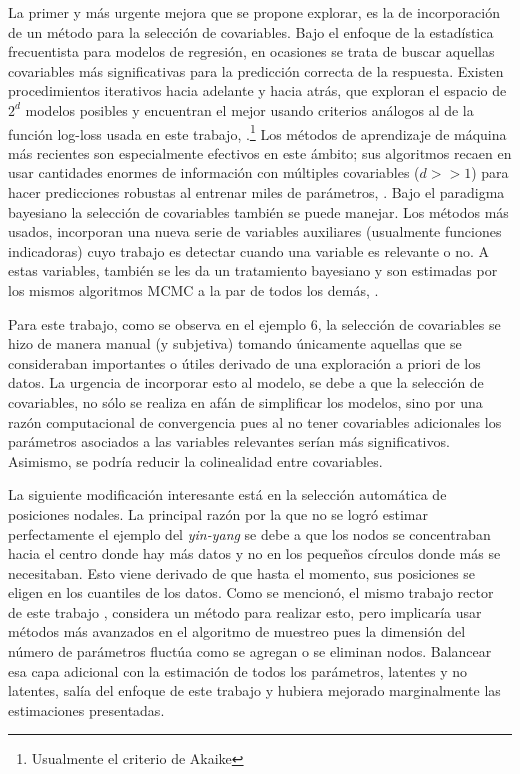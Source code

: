 \documentclass[../Main/Main.tex]{subfiles}
\begin{document}
La primer y más urgente mejora que se propone explorar, es la de incorporación de un método para la selección de covariables. Bajo el enfoque de la estadística frecuentista para modelos de regresión, en ocasiones se trata de buscar aquellas covariables más significativas para la predicción correcta de la respuesta. Existen procedimientos iterativos hacia adelante y hacia atrás, que exploran el espacio de $2^d$ modelos posibles y encuentran el mejor usando criterios análogos al de la función log-loss usada en este trabajo, \citet{bishop2006pattern}.\footnote{Usualmente el criterio de Akaike} Los métodos de aprendizaje de máquina más recientes son especialmente efectivos en este ámbito; sus algoritmos recaen en usar cantidades enormes de información con múltiples covariables ($d>>1$) para hacer predicciones robustas al entrenar miles de parámetros, \citet{nielsen2015neural}. Bajo el paradigma bayesiano la selección de covariables también se puede manejar. Los métodos más usados, incorporan una nueva serie de variables auxiliares (usualmente funciones indicadoras) cuyo trabajo es detectar cuando una variable es relevante o no. A estas variables, también se les da un tratamiento bayesiano y son estimadas por los mismos algoritmos MCMC a la par de todos los demás, \citet{o2009review}.

Para este trabajo, como se observa en el ejemplo 6, la selección de covariables se hizo de manera manual (y subjetiva) tomando únicamente aquellas que se consideraban importantes o útiles derivado de una exploración a priori de los datos. La urgencia de incorporar esto al modelo, se debe a que la selección de covariables, no sólo se realiza en afán de simplificar los modelos, sino por una razón computacional de convergencia pues al no tener covariables adicionales los parámetros asociados a las variables relevantes serían más significativos. Asimismo, se podría reducir la colinealidad entre covariables.

La siguiente modificación interesante está en la selección automática de posiciones nodales. La principal razón por la que no se logró estimar perfectamente el ejemplo del \textit{yin-yang} se debe a que los nodos se concentraban hacia el centro donde hay más datos y no en los pequeños círculos donde más se necesitaban. Esto viene derivado de que hasta el momento, sus posiciones se eligen en los cuantiles de los datos. Como se mencionó, el mismo trabajo rector de este trabajo \citet{mallik1998automatic}, considera un método para realizar esto, pero implicaría usar métodos más avanzados en el algoritmo de muestreo pues la dimensión del número de parámetros fluctúa como se agregan o se eliminan nodos. Balancear esa capa adicional con la estimación de todos los parámetros, latentes y no latentes, salía del enfoque de este trabajo y hubiera mejorado marginalmente las estimaciones presentadas.
\end{document}
